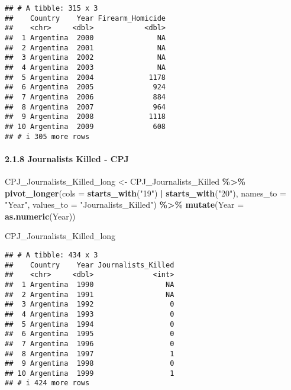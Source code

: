 \documentclass[
  11pt,
]{article}
\newenvironment{Shaded}{\begin{snugshade}}{\end{snugshade}}
\newcommand{\AttributeTok}[1]{\textcolor[rgb]{0.13,0.29,0.53}{#1}}
\newcommand{\FunctionTok}[1]{\textcolor[rgb]{0.13,0.29,0.53}{\textbf{#1}}}
\newcommand{\NormalTok}[1]{#1}
\newcommand{\OtherTok}[1]{\textcolor[rgb]{0.56,0.35,0.01}{#1}}
\newcommand{\SpecialCharTok}[1]{\textcolor[rgb]{0.81,0.36,0.00}{\textbf{#1}}}
\newcommand{\StringTok}[1]{\textcolor[rgb]{0.31,0.60,0.02}{#1}}
\begin{document}
\begin{verbatim}
## # A tibble: 315 x 3
##    Country    Year Firearm_Homicide
##    <chr>     <dbl>            <dbl>
##  1 Argentina  2000               NA
##  2 Argentina  2001               NA
##  3 Argentina  2002               NA
##  4 Argentina  2003               NA
##  5 Argentina  2004             1178
##  6 Argentina  2005              924
##  7 Argentina  2006              884
##  8 Argentina  2007              964
##  9 Argentina  2008             1118
## 10 Argentina  2009              608
## # i 305 more rows
\end{verbatim}

\paragraph{2.1.8 Journalists Killed -
CPJ}\label{journalists-killed---cpj-1}

\begin{Shaded}
\begin{Highlighting}[]
\NormalTok{CPJ\_Journalists\_Killed\_long }\OtherTok{\textless{}{-}}\NormalTok{ CPJ\_Journalists\_Killed }\SpecialCharTok{\%\textgreater{}\%}
  \FunctionTok{pivot\_longer}\NormalTok{(}\AttributeTok{cols =} \FunctionTok{starts\_with}\NormalTok{(}\StringTok{"19"}\NormalTok{) }\SpecialCharTok{|} \FunctionTok{starts\_with}\NormalTok{(}\StringTok{"20"}\NormalTok{), }
               \AttributeTok{names\_to =} \StringTok{"Year"}\NormalTok{, }\AttributeTok{values\_to =} \StringTok{"Journalists\_Killed"}\NormalTok{) }\SpecialCharTok{\%\textgreater{}\%}
  \FunctionTok{mutate}\NormalTok{(}\AttributeTok{Year =} \FunctionTok{as.numeric}\NormalTok{(Year))}

\NormalTok{CPJ\_Journalists\_Killed\_long}
\end{Highlighting}
\end{Shaded}

\begin{verbatim}
## # A tibble: 434 x 3
##    Country    Year Journalists_Killed
##    <chr>     <dbl>              <int>
##  1 Argentina  1990                 NA
##  2 Argentina  1991                 NA
##  3 Argentina  1992                  0
##  4 Argentina  1993                  0
##  5 Argentina  1994                  0
##  6 Argentina  1995                  0
##  7 Argentina  1996                  0
##  8 Argentina  1997                  1
##  9 Argentina  1998                  0
## 10 Argentina  1999                  1
## # i 424 more rows
\end{verbatim}
\end{document}
